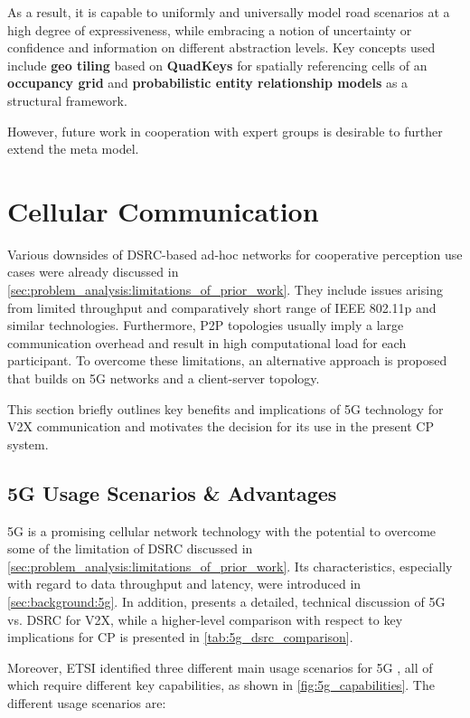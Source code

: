 As a result, it is capable to uniformly and universally model road scenarios at a high degree of expressiveness, while embracing a notion of uncertainty or confidence and information on different abstraction levels. Key concepts used include \textbf{geo tiling} based on \textbf{QuadKeys} for spatially referencing cells of an \textbf{occupancy grid} and \textbf{probabilistic entity relationship models} as a structural framework.

However, future work in cooperation with expert groups is desirable to further extend the meta model.

\section{Cellular Communication}
\label{sec:concept_design:cellular_communication}
Various downsides of DSRC-based ad-hoc networks for cooperative perception use cases were already discussed in \cref{sec:problem_analysis:limitations_of_prior_work}. They include issues arising from limited throughput and comparatively short range of IEEE 802.11p and similar technologies. Furthermore, P2P topologies usually imply a large communication overhead and result in high computational load for each participant. To overcome these limitations, an alternative approach is proposed that builds on 5G networks and a client-server topology.

This section briefly outlines key benefits and implications of 5G technology for V2X communication and motivates the decision for its use in the present CP system.

\subsection{5G Usage Scenarios \& Advantages}
\label{subsec:concept_design:5g_usage_scenarios_advantages}
5G is a promising cellular network technology with the potential to overcome some of the limitation of DSRC discussed in \cref{sec:problem_analysis:limitations_of_prior_work}. Its characteristics, especially with regard to data throughput and latency, were introduced in \cref{sec:background:5g}. In addition, \cite{5GAutomotiveAssociation2016} presents a detailed, technical discussion of 5G vs. DSRC for V2X, while a higher-level comparison with respect to key implications for CP is presented in \cref{tab:5g_dsrc_comparison}.
\par
\bigskip

Moreover, ETSI identified three different main usage scenarios for 5G \cite{ETSI5G}, all of which require different key capabilities, as shown in \cref{fig:5g_capabilities}. The different usage scenarios are:

